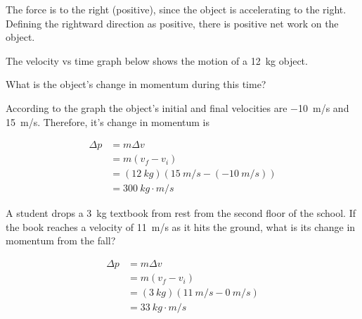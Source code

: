 \documentclass[]{exam}
\begin{document}
\begin{questions}
\ifprintanswers
\else
\fillwithlines{3cm}
\fi

\begin{solution}
The force is to the right (positive), since the object is accelerating to the right. Defining the rightward direction as positive, there is positive net work on the object.
\end{solution}
\fi



\question
The velocity vs time graph below shows the motion of a \SI{12}{kg} object.

\begin{center}
\end{center}

What is the object's change in momentum during this time?

\begin{solutionorbox}[5cm]
According to the graph the object's initial and final velocities are \SI{-10}{m/s} and \SI{15}{m/s}. Therefore, it's change in momentum is

\begin{align*}
    \Delta p &= m \Delta v \\[1ex]
    &= m(v_f - v_i) \\[1ex]
    &= (\SI{12}{kg}) \left(\SI{15}{m/s} - \left(\SI{-10}{m/s}\right)\right) \\[1ex]
    &= \boxed{\SI{300}{kg\cdot m/s}}
\end{align*}
\end{solutionorbox}

\question
A student drops a \SI{3}{kg} textbook from rest from the second floor of the school. If the book reaches a velocity of \SI{11}{m/s} as it hits the ground, what is its change in momentum from the fall?

\begin{solutionorbox}[4cm]
\begin{align*}
    \Delta p &= m \Delta v \\[1ex]
    &= m\left(v_f - v_i\right) \\[1ex]
    &= (\SI{3}{kg})(\SI{11}{m/s} - \SI{0}{m/s}) \\[1ex]
    &= \boxed{\SI{33}{kg\cdot m/s}}
\end{align*}
\end{solutionorbox}


\end{questions}
\end{document}
